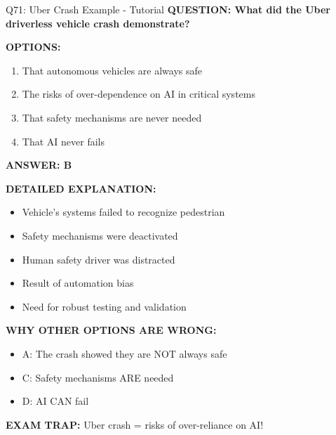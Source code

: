 \documentclass[8pt]{beamer}
\begin{document}
	\begin{frame}{Q71: Uber Crash Example - Tutorial}
		\fontsize{6.5}{7.5}\selectfont
		\textbf{QUESTION: What did the Uber driverless vehicle crash demonstrate?}
		
		\vspace{0.1cm}
		\textbf{OPTIONS:}
		\begin{enumerate}
			\item That autonomous vehicles are always safe
			\item The risks of over-dependence on AI in critical systems
			\item That safety mechanisms are never needed
			\item That AI never fails
		\end{enumerate}
		
		\vspace{0.1cm}
		\textcolor{myblue}{\textbf{ANSWER: B}}
		
		\vspace{0.1cm}
		\textbf{DETAILED EXPLANATION:}
		\begin{itemize}
			\item Vehicle's systems failed to recognize pedestrian
			\item Safety mechanisms were deactivated
			\item Human safety driver was distracted
			\item Result of automation bias
			\item Need for robust testing and validation
		\end{itemize}
		
		\vspace{0.1cm}
		\textcolor{myred}{\textbf{WHY OTHER OPTIONS ARE WRONG:}}
		\begin{itemize}
			\item \textcolor{myred}{A:} The crash showed they are NOT always safe
			\item \textcolor{myred}{C:} Safety mechanisms ARE needed
			\item \textcolor{myred}{D:} AI CAN fail
		\end{itemize}
		
		\textcolor{myred}{\textbf{EXAM TRAP:}} Uber crash = \textcolor{myblue}{risks of over-reliance on AI}!
	\end{frame}
	
\end{document}
